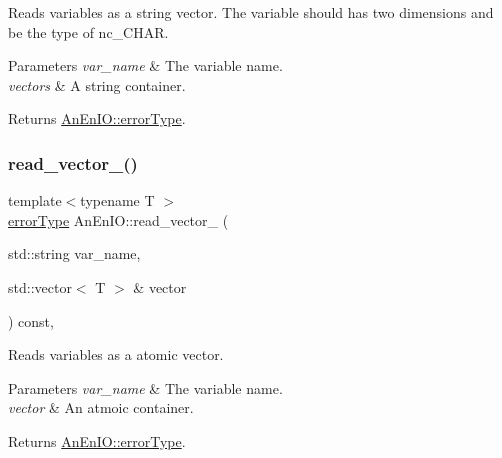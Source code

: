 Reads variables as a string vector. The variable should has two dimensions and be the type of nc\+\_\+\+C\+H\+AR.


\begin{DoxyParams}{Parameters}
{\em var\+\_\+name} & The variable name. \\
\hline
{\em vectors} & A string container. \\
\hline
\end{DoxyParams}
\begin{DoxyReturn}{Returns}
\mbox{\hyperlink{class_an_en_i_o_aa56bc1ec6610b86db4349bce20f9ead0}{An\+En\+I\+O\+::error\+Type}}. 
\end{DoxyReturn}
\mbox{\label{class_an_en_i_o_a3c3a3f86f90ea7610e086d371414d54f}} 
\subsubsection{\texorpdfstring{read\+\_\+vector\+\_\+()}{read\_vector\_()}}
{\footnotesize\ttfamily template$<$typename T $>$ \\
\mbox{\hyperlink{class_an_en_i_o_aa56bc1ec6610b86db4349bce20f9ead0}{error\+Type}} An\+En\+I\+O\+::read\+\_\+vector\+\_\+ (\begin{DoxyParamCaption}\item[{std\+::string}]{var\+\_\+name,  }\item[{std\+::vector$<$ T $>$ \&}]{vector }\end{DoxyParamCaption}) const\hspace{0.3cm}{\ttfamily [inline]}, {\ttfamily [protected]}}

Reads variables as a atomic vector.


\begin{DoxyParams}{Parameters}
{\em var\+\_\+name} & The variable name. \\
\hline
{\em vector} & An atmoic container. \\
\hline
\end{DoxyParams}
\begin{DoxyReturn}{Returns}
\mbox{\hyperlink{class_an_en_i_o_aa56bc1ec6610b86db4349bce20f9ead0}{An\+En\+I\+O\+::error\+Type}}. 
\end{DoxyReturn}
\mbox{\label{class_an_en_i_o_a5ca1c7df3da9720967d7ed06f2dfe09b}} 
